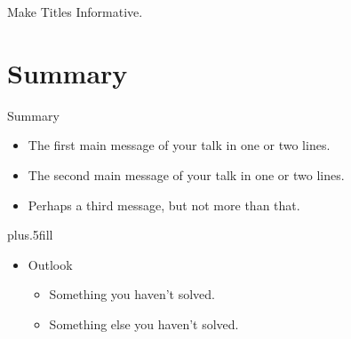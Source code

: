 \documentclass{beamer}
\begin{document}
\begin{frame}{Make Titles Informative.}
\end{frame}



\section*{Summary}

\begin{frame}{Summary}

  \begin{itemize}
  \item
    The \alert{first main message} of your talk in one or two lines.
  \item
    The \alert{second main message} of your talk in one or two lines.
  \item
    Perhaps a \alert{third message}, but not more than that.
  \end{itemize}
  
  \vskip0pt plus.5fill
  \begin{itemize}
  \item
    Outlook
    \begin{itemize}
    \item
      Something you haven't solved.
    \item
      Something else you haven't solved.
    \end{itemize}
  \end{itemize}
\end{frame}
\end{document}
